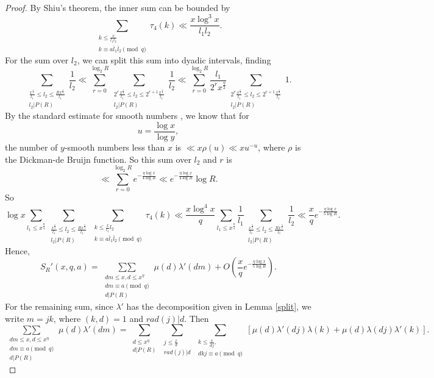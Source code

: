 \documentclass{amsart}
\begin{document}
\begin{proof}
By Shiu's theorem, the inner sum can be bounded by
$$\mathop{\sum}\limits_{\substack{k\leq \frac x{l_1l_2} \\ k\equiv a\bar l_1\bar l_2\pmod q }}\tau_4(k)\ll \frac{x\log^3 x}{l_1l_2}.$$
For the sum over $l_2$, we can split this sum into dyadic intervals, finding
$$\sum_{\substack{\frac{x^\frac \eta 2}{l_1}\leq l_2\leq \frac{Rx^\frac \eta 2}{l_1} \\ l_2|P(R)}}\frac{1}{l_2}\ll \sum_{r=0}^{\log_2R}\sum_{\substack{2^r\frac{x^\frac \eta 2}{l_1}\leq l_2\leq 2^{r+1}\frac{x^\frac \eta 2}{l_1} \\ l_2|P(R)}}\frac{1}{l_2}\ll \sum_{r=0}^{\log_2R}\frac{l_1}{2^rx^\frac \eta 2}\sum_{\substack{2^r\frac{x^\frac \eta 2}{l_1}\leq l_2\leq 2^{r+1}\frac{x^\frac \eta 2}{l_1} \\ l_2|P(R)}}1. $$
By the standard estimate for smooth numbers \cite{Di}, we know that for
$$u=\frac{\log x}{\log y},$$
the number of $y$-smooth numbers less than $x$ is $\ll x\rho(u)\ll xu^{-u}$, where $\rho$ is the Dickman-de Bruijn function. So this sum over $l_2$ and $r$ is
$$\ll \sum_{r=0}^{\log_2R}e^{-\frac{\eta\log x}{4\log R}}\ll e^{-\frac{\eta\log x}{4\log R}}\log R. $$
So
$$\log x\sum_{l_1\leq x^{\frac \eta 4}}\sum_{\substack{\frac{x^\frac \eta 2}{l_1}\leq l_2\leq \frac{Rx^\frac \eta 2}{l_1} \\ l_2|P(R)}}\mathop{\sum}\limits_{\substack{k\leq \frac x{l_1}{l_2} \\ k\equiv a\bar l_1\bar l_2\pmod q }}\tau_4(k)\ll \frac{x\log^4 x}{q}\sum_{l_1\leq x^{\frac \eta 4}}\frac{1}{l_1}\sum_{\substack{\frac{x^\frac \eta 2}{l_1}\leq l_2\leq \frac{Rx^\frac \eta 2}{l_1} \\ l_2|P(R)}}\frac{1}{l_2}\ll \frac xqe^{-\frac{\eta\log x}{5\log R}}.$$
Hence,
$$S_R'(x,q,a)=\mathop{\sum\sum}\limits_{\substack{dm\leq x,d\leq x^\eta \\ dm\equiv a\pmod q \\ d|P(R)}}\mu(d)\lambda'(dm)+O\left(\frac{x}{q}e^{-\frac{\eta\log x}{5\log R}}\right).$$
For the remaining sum, since $\lambda'$ has the decomposition given in Lemma \ref{split}, we write $m=jk$, where $(k,d)=1$ and $rad(j)|d$.  Then
$$\mathop{\sum\sum}\limits_{\substack{dm\leq x,d\leq x^\eta \\ dm\equiv a\pmod q \\ d|P(R)}}\mu(d)\lambda'(dm)=\sum_{\substack{d\leq x^\eta \\ d|P(R)}}\sum_{\substack{j\leq \frac xd \\ rad(j)|d}}\mathop{\sum}\limits_{\substack{k\leq \frac{x}{dj},\\ dkj\equiv a\pmod q }}[\mu(d)\lambda'(dj)\lambda(k)+\mu(d)\lambda(dj)\lambda'(k)].$$

\end{proof}
\end{document}
